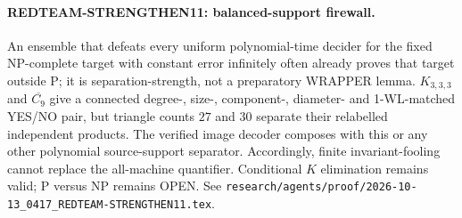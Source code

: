\paragraph{REDTEAM-STRENGTHEN11: balanced-support firewall.}
An ensemble that defeats every uniform polynomial-time decider for the fixed
NP-complete target with constant error infinitely often already proves that
target outside P; it is separation-strength, not a preparatory WRAPPER lemma.
$K_{3,3,3}$ and $\overline{C_9}$ give a connected degree-, size-, component-,
diameter- and 1-WL-matched YES/NO pair, but triangle counts $27$ and $30$
separate their relabelled independent products.  The verified image decoder
composes with this or any other polynomial source-support separator.
Accordingly, finite invariant-fooling cannot replace the all-machine
quantifier.  Conditional $K$ elimination remains valid; P versus NP remains
OPEN.  See
\texttt{research/agents/proof/2026-10-13\_0417\_REDTEAM-STRENGTHEN11.tex}.
